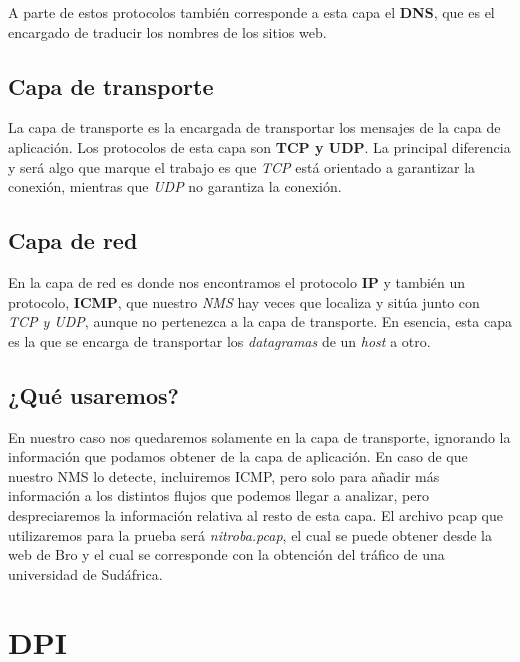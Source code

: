 A parte de estos protocolos también corresponde a esta capa el \textbf{DNS}, 
que es el encargado de traducir los nombres de los sitios web.

\subsection{Capa de transporte}

La capa de transporte es la encargada de transportar los mensajes de la capa de aplicación. 
Los protocolos de esta capa son \textbf{TCP y UDP}. La principal diferencia y será algo que 
marque el trabajo es que \textit{TCP} está orientado a garantizar la conexión, mientras que \textit{UDP} no 
garantiza la conexión.

\subsection{Capa de red}

En la capa de red es donde nos encontramos el protocolo \textbf{IP} y también 
un protocolo, \textbf{ICMP}, que nuestro \textit{NMS} hay veces que localiza y 
sitúa junto con \textit{TCP y UDP}, aunque no pertenezca a la capa de transporte.
\intro
En esencia, esta capa es la que se encarga de transportar los \textit{datagramas} 
de un \textit{host} a otro.

\subsection{¿Qué usaremos?}

En nuestro caso nos quedaremos solamente en la capa de transporte, 
ignorando la información que podamos obtener de la capa 
de aplicación. En caso de que nuestro NMS lo detecte, incluiremos ICMP, 
pero solo para añadir más 
información a los distintos flujos que podemos llegar a analizar, 
pero despreciaremos la información relativa al resto de esta capa. 
El archivo pcap que utilizaremos para la prueba será \textit{nitroba.pcap}, 
el cual se puede obtener desde la web de Bro y el cual se corresponde con 
la obtención del tráfico de una universidad de Sudáfrica.

\section{DPI}

